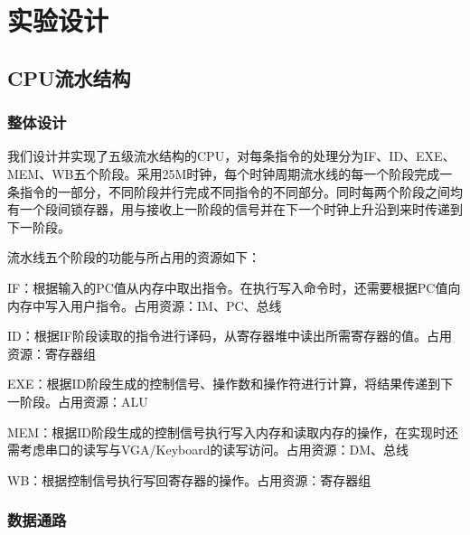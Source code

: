 
\chapter{实验设计} %

\label{Chapter3} %


\section{CPU流水结构}


\subsection{整体设计}


我们设计并实现了五级流水结构的CPU，对每条指令的处理分为IF、ID、EXE、MEM、WB五个阶段。采用25M时钟，每个时钟周期流水线的每一个阶段完成一条指令的一部分，不同阶段并行完成不同指令的不同部分。同时每两个阶段之间均有一个段间锁存器，用与接收上一阶段的信号并在下一个时钟上升沿到来时传递到下一阶段。

流水线五个阶段的功能与所占用的资源如下：

IF：根据输入的PC值从内存中取出指令。在执行写入命令时，还需要根据PC值向内存中写入用户指令。占用资源：IM、PC、总线

ID：根据IF阶段读取的指令进行译码，从寄存器堆中读出所需寄存器的值。占用资源：寄存器组

EXE：根据ID阶段生成的控制信号、操作数和操作符进行计算，将结果传递到下一阶段。占用资源：ALU

MEM：根据ID阶段生成的控制信号执行写入内存和读取内存的操作，在实现时还需考虑串口的读写与VGA/Keyboard的读写访问。占用资源：DM、总线

WB：根据控制信号执行写回寄存器的操作。占用资源：寄存器组


\subsection{数据通路}

